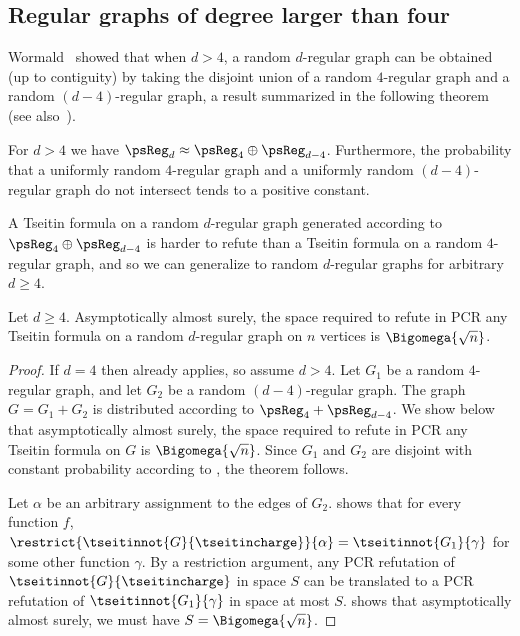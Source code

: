%

\subsection{Regular graphs of degree larger than four}
Wormald~\cite[Corollary 4.17]{W} showed that when $d > 4$, a random $d$-regular graph can be obtained (up to contiguity) by taking the disjoint union of a random $4$-regular graph and a random $(d-4)$-regular graph, a result summarized in the following theorem (see also~\cite[Corollary 9.44]{JLR}).

\begin{theorem}\label{th:regular}
 For $d > 4$ we have $\psReg_d \approx \psReg_4 \oplus \psReg_{d-4}$. Furthermore, the probability that a uniformly random $4$-regular graph and a uniformly random $(d-4)$-regular graph do not intersect tends to a positive constant.
\end{theorem}

A Tseitin formula on a random $d$-regular graph generated according to $\psReg_4 \oplus \psReg_{d-4}$ is harder to refute than a Tseitin formula on a random $4$-regular graph, and so we can generalize  to random $d$-regular graphs for arbitrary $d \geq 4$.

\begin{theorem}
 Let $d \geq 4$. Asymptotically almost surely, the space required to refute in PCR any Tseitin formula on a random $d$-regular graph on $n$ vertices is $\Bigomega{\sqrt{n}}$.
\end{theorem}
\begin{proof}
 If $d = 4$ then  already applies, so assume $d > 4$.
 Let $G_1$ be a random $4$-regular graph, and let $G_2$ be a random $(d-4)$-regular graph. The graph $G = G_1 + G_2$ is distributed according to $\psReg_4 + \psReg_{d-4}$. We show below that asymptotically almost surely, the space required to refute in PCR any Tseitin formula on $G$ is $\Bigomega{\sqrt{n}}$. Since $G_1$ and $G_2$ are disjoint with constant probability according to , the theorem follows.

 Let $\alpha$ be an arbitrary assignment to the edges of $G_2$.  shows that for every function $f$, $\restrict{\tseitinnot{G}{\tseitincharge}}{\alpha} = \tseitinnot{G_1}{\gamma}$ for some other function $\gamma$. By a restriction argument, any PCR refutation of $\tseitinnot{G}{\tseitincharge}$ in space $S$ can be translated to a PCR refutation of $\tseitinnot{G_1}{\gamma}$ in space at most $S$.  shows that asymptotically almost surely, we must have $S  = \Bigomega{\sqrt{n}}$.
\end{proof}


